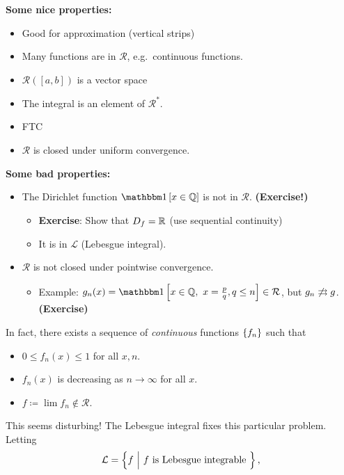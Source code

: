 \textbf{Some nice properties:}

\begin{itemize}
\item
  Good for approximation (vertical strips)
\item
  Many functions are in \(\mathcal R\), e.g.~continuous functions.
\item
  \(\mathcal{R} ([a, b])\) is a vector space
\item
  The integral is an element of \(\mathcal{R}^*\).
\item
  FTC
\item
  \(\mathcal R\) is closed under uniform convergence.
\end{itemize}

\textbf{Some bad properties:}

\begin{itemize}
\item
  The Dirichlet function \(\indic{x\in\QQ}\) is not in \(\mathcal R\).
  \textbf{(Exercise!)}

  \begin{itemize}
  \item
    \textbf{Exercise}: Show that \(D_f = {\mathbb{R}}\) (use sequential
    continuity)
  \item
    It is in \(\mathcal L\) (Lebesgue integral).
  \end{itemize}
\item
  \(\mathcal R\) is not closed under pointwise convergence.

  \begin{itemize}
  \tightlist
  \item
    Example:
    \(g_n(x) = \indic{x\in \QQ,~ x = \frac p q, q \leq n} \in \mathcal R\),
    but \(g_n \not\rightrightarrows g\). \textbf{(Exercise)}
  \end{itemize}
\end{itemize}

In fact, there exists a sequence of \emph{continuous} functions
\(\left\{{f_n}\right\}\) such that

\begin{itemize}
\item
  \(0 \leq f_n(x) \leq 1\) for all \(x, n\).
\item
  \(f_n(x)\) is decreasing as \(n\to\infty\) for all \(x\).
\item
  \(f \coloneqq \lim f_n \not\in\mathcal R\).
\end{itemize}

This seems disturbing! The Lebesgue integral fixes this particular
problem. Letting
\begin{align*}
\mathcal L = \left\{{f {~\mathrel{\Big|}~} f \text{ is Lebesgue integrable }}\right\},
\end{align*}

